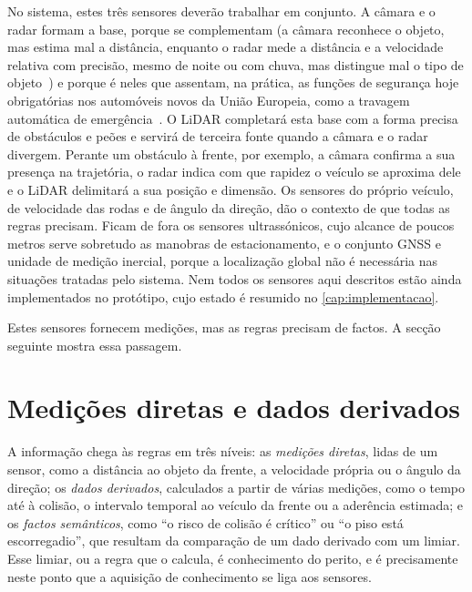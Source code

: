 No sistema, estes três sensores deverão trabalhar em conjunto. A câmara e o radar
formam a base, porque se complementam (a câmara reconhece o objeto, mas
estima mal a distância, enquanto o radar mede a distância e a velocidade
relativa com precisão, mesmo de noite ou com chuva, mas distingue mal o tipo
de objeto~\cite{wei2022}) e porque é neles que assentam, na prática, as
funções de segurança hoje obrigatórias nos automóveis novos da União
Europeia, como a travagem automática de emergência~\cite{ue2019_2144}. O
LiDAR completará esta base com a forma precisa de obstáculos e peões e servirá
de terceira fonte quando a câmara e o radar divergem. Perante um obstáculo
à frente, por exemplo, a câmara confirma a sua presença na
trajetória, o radar indica com que rapidez o veículo se aproxima dele e o
LiDAR delimitará a sua posição e dimensão. Os sensores do próprio veículo,
de velocidade das rodas e de ângulo da direção, dão o contexto de que todas
as regras precisam. Ficam de fora os sensores ultrassónicos, cujo alcance de
poucos metros serve sobretudo as manobras de estacionamento, e o conjunto
GNSS e unidade de medição inercial, porque a localização global não é
necessária nas situações tratadas pelo sistema. Nem todos os sensores
aqui descritos estão ainda implementados no protótipo, cujo estado é
resumido no \cref{cap:implementacao}.

Estes sensores fornecem medições, mas as regras precisam de factos. A
secção seguinte mostra essa passagem.

\section{Medições diretas e dados derivados}
\label{sec:sensores-dados}

A informação chega às regras em três níveis: as \emph{medições diretas},
lidas de um sensor, como a distância ao objeto da frente, a velocidade
própria ou o ângulo da direção; os \emph{dados derivados}, calculados a
partir de várias medições, como o tempo até à colisão, o intervalo
temporal ao veículo da frente ou a aderência estimada; e os \emph{factos
semânticos}, como \enquote{o risco de colisão é crítico} ou \enquote{o piso está
escorregadio}, que resultam da comparação de um dado derivado com um limiar. Esse limiar,
ou a regra que o calcula, é conhecimento do perito, e é
precisamente neste ponto que a aquisição de conhecimento se liga aos
sensores.

